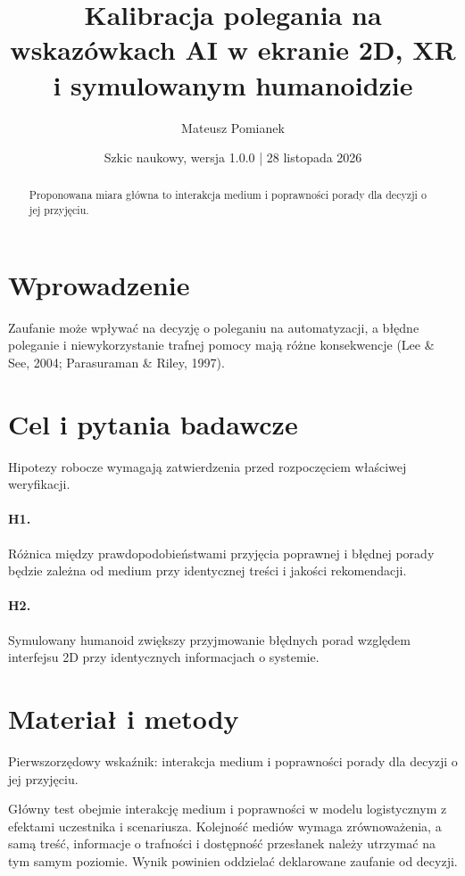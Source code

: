\documentclass[11pt,a4paper]{article}
\title{Kalibracja polegania na wskazówkach AI w ekranie 2D, XR i symulowanym humanoidzie}
\author{Mateusz Pomianek}
\date{Szkic naukowy, wersja 1.0.0 | 28 listopada 2026}
\begin{document}
\maketitle

\begin{abstract}

Proponowana miara główna to interakcja medium i poprawności porady dla decyzji o jej przyjęciu.

\end{abstract}

\section{Wprowadzenie}

Zaufanie może wpływać na decyzję o poleganiu na automatyzacji, a błędne poleganie i niewykorzystanie trafnej pomocy mają różne konsekwencje (Lee \& See, 2004; Parasuraman \& Riley, 1997).

\section{Cel i pytania badawcze}

Hipotezy robocze wymagają zatwierdzenia przed rozpoczęciem właściwej weryfikacji.

\paragraph{H1.} Różnica między prawdopodobieństwami przyjęcia poprawnej i błędnej porady będzie zależna od medium przy identycznej treści i jakości rekomendacji.

\paragraph{H2.} Symulowany humanoid zwiększy przyjmowanie błędnych porad względem interfejsu 2D przy identycznych informacjach o systemie.

\section{Materiał i metody}

Pierwszorzędowy wskaźnik: interakcja medium i poprawności porady dla decyzji o jej przyjęciu.

Główny test obejmie interakcję medium i poprawności w modelu logistycznym z efektami uczestnika i scenariusza. Kolejność mediów wymaga zrównoważenia, a samą treść, informacje o trafności i dostępność przesłanek należy utrzymać na tym samym poziomie. Wynik powinien oddzielać deklarowane zaufanie od decyzji.
\end{document}

